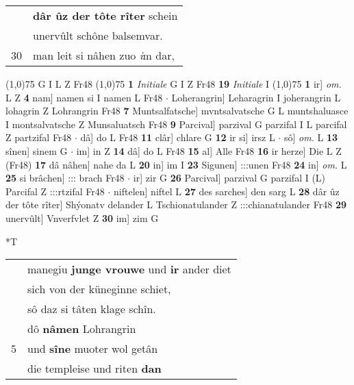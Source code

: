 \documentclass[8pt,a4paper,notitlepage]{article}
\begin{document}
\begin{table}[ht]
\begin{minipage}[t]{0.5\linewidth}
\begin{tabular}{rl}
 & \textbf{dâr ûz der tôte rîter} schein\\ 
 & unervûlt schône balsemvar.\\ 
30 & man leit si nâhen zuo \textit{i}m dar,\\ 
\end{tabular}
\scriptsize
\line(1,0){75} \newline
G I L Z Fr48 \newline
\line(1,0){75} \newline
\textbf{1} \textit{Initiale} G I Z Fr48  \textbf{19} \textit{Initiale} I  \newline
\line(1,0){75} \newline
\textbf{1} ir] \textit{om.} L Z \textbf{4} nam] namen si I namen L Fr48  $\cdot$ Loherangrin] Leharagrin I joherangrin L lohagrin Z Lohrangrin Fr48 \textbf{7} Muntsalfatsche] mvntsalvatsche G L muntshaluasce I montsalvatsche Z Munsaluatsch Fr48 \textbf{9} Parcival] parzival G parzifal I L parcifal Z partzifal Fr48  $\cdot$ dâ] do L Fr48 \textbf{11} clâr] chlare G \textbf{12} ir si] irsz L  $\cdot$ sô] \textit{om.} L \textbf{13} sînen] sinem G  $\cdot$ im] in Z \textbf{14} dâ] do L Fr48 \textbf{15} al] Alle Fr48 \textbf{16} ir herze] Die L Z (Fr48) \textbf{17} dâ nâhen] nahe da L \textbf{20} in] im I \textbf{23} Sigunen] :::unen Fr48 \textbf{24} in] \textit{om.} L \textbf{25} si brâchen] ::: brach Fr48  $\cdot$ ir] zir G \textbf{26} Parcival] parzival G parzifal I (L) Parcifal Z :::rtzifal Fr48  $\cdot$ niftelen] niftel L \textbf{27} des sarches] den sarg L \textbf{28} dâr ûz der tôte rîter] Shýonatv delander L Tschionatulander Z :::chianatulander Fr48 \textbf{29} unervûlt] Vnverfvlet Z \textbf{30} im] zim G \newline
\end{minipage}
\hspace{0.5cm}
\begin{minipage}[t]{0.5\linewidth}
\small
\begin{center}*T
\end{center}
\begin{tabular}{rl}
 & manegiu \textbf{junge vrouwe} und \textbf{ir} ander diet\\ 
 & sich von der küneginne schiet,\\ 
 & sô daz si tâten klage schîn.\\ 
 & dô \textbf{nâmen} Lohrangrin\\ 
5 & und \textbf{sîne} muoter wol getân\\ 
 & die templeise und riten \textbf{dan}\\ 

\end{tabular}
\end{minipage}
\end{table}
\end{document}
